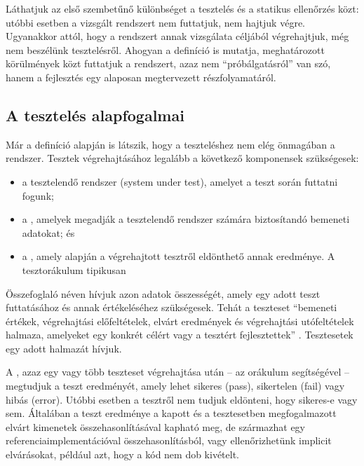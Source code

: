 Láthatjuk az első szembetűnő különbséget a tesztelés és a statikus ellenőrzés közt: utóbbi esetben a vizsgált rendszert nem futtatjuk, nem hajtjuk végre. Ugyanakkor attól, hogy a rendszert annak vizsgálata céljából végrehajtjuk, még nem beszélünk tesztelésről. Ahogyan a definíció is mutatja, meghatározott körülmények közt futtatjuk a rendszert, azaz nem ``próbálgatásról'' van szó, hanem a fejlesztés egy alaposan megtervezett részfolyamatáról.


\subsection{A tesztelés alapfogalmai}
Már a definíció alapján is látszik, hogy a teszteléshez nem elég önmagában a rendszer. Tesztek végrehajtásához legalább a következő komponensek szükségesek: 
\begin{itemize}
\item a tesztelendő rendszer (system under test), amelyet a teszt során futtatni fogunk;
\item a , amelyek megadják a tesztelendő rendszer számára biztosítandó bemeneti adatokat; és
\item a , amely alapján a végrehajtott tesztről eldönthető annak eredménye. A tesztorákulum tipikusan 
\end{itemize}

Összefoglaló néven  hívjuk azon adatok összességét, amely egy adott teszt futtatásához és annak értékeléséhez szükségesek. Tehát a teszteset ``bemeneti értékek, végrehajtási előfeltételek, elvárt eredmények és végrehajtási utófeltételek halmaza, amelyeket egy konkrét célért vagy a tesztért fejlesztettek'' \cite{HTB-glossary,IEEE-24765}. Tesztesetek egy adott halmazát  hívjuk.

A , azaz egy vagy több teszteset végrehajtása után \cite{IEEE-24765} -- az orákulum segítségével -- megtudjuk a teszt eredményét, amely lehet sikeres (pass), sikertelen (fail) vagy hibás (error). Utóbbi esetben a tesztről nem tudjuk eldönteni, hogy sikeres-e vagy sem.
Általában a teszt eredménye a kapott és a tesztesetben megfogalmazott elvárt kimenetek összehasonlításával kapható meg, de származhat egy referenciaimplementációval összehasonlításból, vagy ellenőrizhetünk implicit elvárásokat, például azt, hogy a kód nem dob kivételt.

